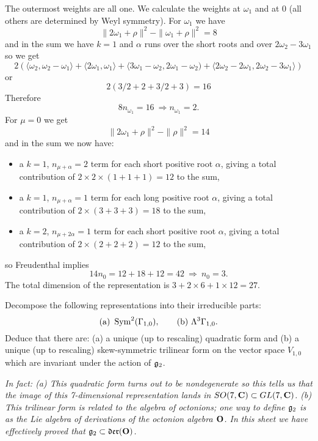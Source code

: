 \documentclass[12pt]{article}
\begin{document}
\begin{answer}
\begin{enumerate}[(a)]
The outermost weights are all one. We calculate the weights at $\omega_1$ and at $0$ (all others are determined by Weyl symmetry). For $\omega_1$ we have
\[\|2\omega_1+\rho\|^2-\|\omega_1+\rho\|^2=8\]
and in the sum we have $k=1$ and $\alpha$ runs over the short roots and over $2\omega_2-3\omega_1$ so we get
\[2\left(\langle\omega_2,\omega_2-\omega_1\rangle+\langle 2\omega_1,\omega_1\rangle+\langle 3\omega_1-\omega_2,2\omega_1-\omega_2)+\langle 2\omega_2-2\omega_1,2\omega_2-3\omega_1\rangle\right)\]
or
\[2(3/2+2+3/2+3)=16\]
Therefore
\[8n_{\omega_1}=16\ \Rightarrow n_{\omega_1}=2.\]
For $\mu=0$ we get
\[\|2\omega_1+\rho\|^2-\|\rho\|^2=14\]
and in the sum we now have:
\begin{itemize}
\item a $k=1$, $n_{\mu+\alpha}=2$ term for each short positive root $\alpha$, giving a total contribution of $2\times 2\times(1+1+1)=12$ to the sum,
\item a $k=1$, $n_{\mu+\alpha}=1$ term for each long positive root $\alpha$, giving a total contribution of $2\times(3+3+3)=18$ to the sum,
\item a $k=2$, $n_{\mu+2\alpha}=1$ term for each short positive root $\alpha$, giving a total contribution of $2\times(2+2+2)=12$ to the sum,
\end{itemize}
so Freudenthal implies
\[14n_0=12+18+12=42\ \Rightarrow\ n_0=3.\]
The total dimension of the representation is $3+2\times 6 +1\times 12=27$.
\end{enumerate}
\end{answer}
\newpage
\fi

\bigskip

\begin{question}\label{qun:g2decom}
Decompose the following representations into their irreducible parts:
\[\mbox{(a) }\operatorname{Sym}^2(\Gamma_{1,0}),\qquad\mbox{(b) }\Lambda^3\Gamma_{1,0}.\]
Deduce that there are: (a) a unique (up to rescaling) quadratic form and (b) a unique (up to rescaling) skew-symmetric trilinear form on the vector space $V_{1,0}$ which are invariant under the action of $\mathfrak{g}_2$.

{\em In fact: (a) This quadratic form turns out to be nondegenerate so this tells us that the image of this 7-dimensional representation lands in $SO(7,\mathbf{C})\subset GL(7,\mathbf{C})$. (b) This trilinear form is related to the algebra of octonions; one way to define $\mathfrak{g}_2$ is as the Lie algebra of derivations of the octonion algebra $\mathbf{O}$. In this sheet we have effectively proved that $\mathfrak{g}_2\subset\mathfrak{der}(\mathbf{O})$.}
\end{question}
\end{document}
